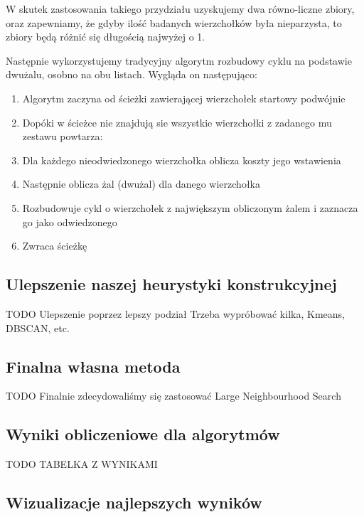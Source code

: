 \documentclass[11pt]{article}
\begin{document}
W skutek zastosowania takiego przydziału uzyskujemy dwa równo-liczne zbiory, oraz zapewniamy, że gdyby ilość badanych wierzchołków była nieparzysta, to zbiory będą różnić się długością najwyżej o 1.

Następnie wykorzystujemy tradycyjny algorytm rozbudowy cyklu na podstawie dwużalu, osobno na obu listach.
Wygląda on następująco:

\begin{enumerate}
    \item Algorytm zaczyna od ścieżki zawierającej wierzchołek startowy podwójnie
    \item Dopóki w ścieżce nie znajdują sie wszystkie wierzchołki z zadanego mu zestawu powtarza:
    \item Dla każdego nieodwiedzonego wierzchołka oblicza koszty jego wstawienia
    \item Następnie oblicza żal (dwużal) dla danego wierzchołka
    \item Rozbudowuje cykl o wierzchołek z największym obliczonym żalem i zaznacza go jako odwiedzonego
    \item Zwraca ścieżkę
\end{enumerate}

\subsection{Ulepszenie naszej heurystyki konstrukcyjnej}\label{subsec:ulepszenie-naszej-heurystyki-konstrukcyjnej}

TODO
Ulepszenie poprzez lepszy podział
Trzeba wypróbować kilka, Kmeans, DBSCAN, etc.

\subsection{Finalna własna metoda}\label{subsec:finalna-wasna-metoda}

TODO
Finalnie zdecydowaliśmy się zastosować Large Neighbourhood Search


\subsection{Wyniki obliczeniowe dla algorytmów}\label{subsec:wyniki-obliczeniowe-dla-algorytmow}

TODO
TABELKA Z WYNIKAMI

\subsection{Wizualizacje najlepszych wyników}\label{subsec:wizualizacje}
\end{document}
